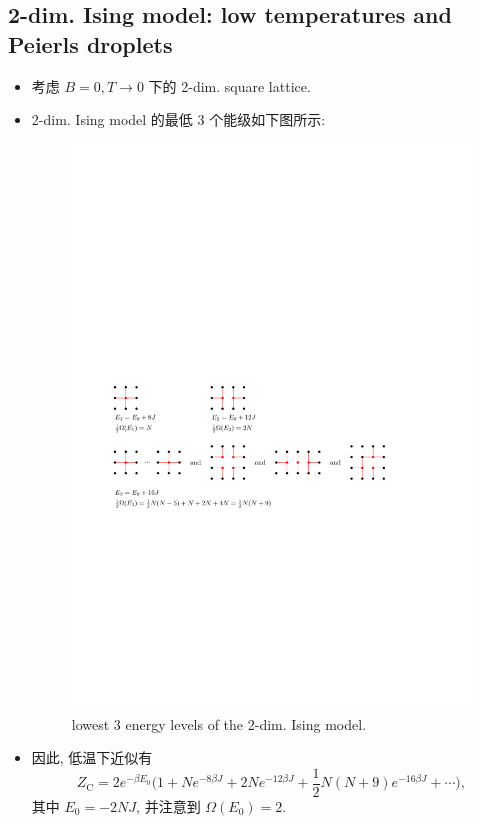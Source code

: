 \subsection{2-dim. Ising model: low temperatures and Peierls droplets}
\begin{itemize}
	\item 考虑 $B = 0, T \rightarrow 0$ 下的 2-dim. square lattice.
	
	\item 2-dim. Ising model 的最低 3 个能级如下图所示:
	
	\begin{figure}[H]
		\centering
		\includegraphics[scale=1]{figures/lowest 3 energy levels of the 2-dim. Ising model.pdf}
		\caption{lowest 3 energy levels of the 2-dim. Ising model.}
	\end{figure}
	
	\item 因此, 低温下近似有
	\begin{equation}
		Z_\text{C} = 2 e^{- \beta E_0} \Big( 1 + N e^{- 8 \beta J} + 2 N e^{- 12 \beta J} + \frac{1}{2} N (N + 9) e^{- 16 \beta J} + \cdots \Big),
	\end{equation}
	其中 $E_0 = - 2 N J$, 并注意到 $\Omega(E_0) = 2$.
	

\end{itemize}
